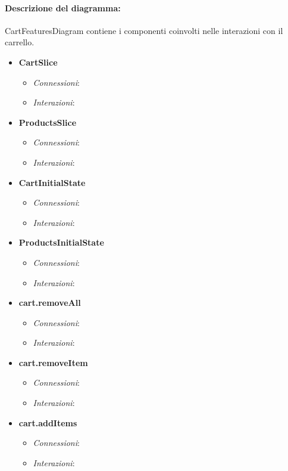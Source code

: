 \paragraph*{Descrizione del diagramma:}
CartFeaturesDiagram contiene i componenti coinvolti nelle interazioni con il carrello.
\begin{itemize}
		\item \textbf{CartSlice}
		\begin{itemize}
			\item \textit{Connessioni}:
			\item \textit{Interazioni}:
		\end{itemize}
		\item \textbf{ProductsSlice}
		\begin{itemize}
			\item \textit{Connessioni}:
			\item \textit{Interazioni}:
		\end{itemize} 
		\item \textbf{CartInitialState}
		\begin{itemize}
			\item \textit{Connessioni}:
			\item \textit{Interazioni}:
		\end{itemize} 
		\item \textbf{ProductsInitialState}
		\begin{itemize}
			\item \textit{Connessioni}:
			\item \textit{Interazioni}:
		\end{itemize} 
		\item \textbf{cart.removeAll}
		\begin{itemize}
			\item \textit{Connessioni}:
			\item \textit{Interazioni}:
		\end{itemize} 
		\item \textbf{cart.removeItem}
		\begin{itemize}
			\item \textit{Connessioni}:
			\item \textit{Interazioni}:
		\end{itemize} 
		\item \textbf{cart.addItems}
		\begin{itemize}
			\item \textit{Connessioni}:
			\item \textit{Interazioni}:
		\end{itemize} 	

\end{itemize}
